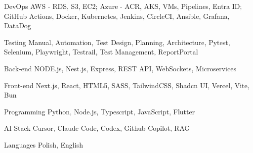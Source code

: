 

\begin{cvskills}

  \cvskill
    {DevOps} %
    {AWS - RDS, S3, EC2; Azure - ACR, AKS, VMs, Pipelines, Entra ID; GitHub Actions, Docker, Kubernetes, Jenkins, CircleCI, Ansible, Grafana, DataDog} %

  \cvskill
    {Testing} %
    {Manual, Automation, Test Design, Planning, Architecture, Pytest, Selenium, Playwright, Testrail, Test Management, ReportPortal} %

  \cvskill
    {Back-end} %
    {NODE.js, Nest.js, Express, REST API, WebSockets, Microservices} %

  \cvskill
    {Front-end} %
    {Next.js, React, HTML5, SASS, TailwindCSS, Shadcn UI, Vercel, Vite, Bun} %

  \cvskill
    {Programming} %
    {Python, Node.js, Typescript, JavaScript, Flutter} %

  \cvskill
    {AI Stack} %
    {Cursor, Claude Code, Codex, Github Copilot, RAG} %

  \cvskill
    {Languages} %
    {Polish, English} %

\end{cvskills}

